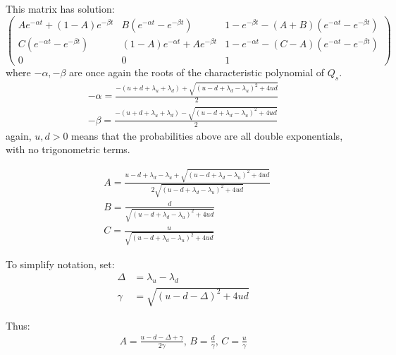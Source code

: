 This matrix has solution:
\begin{equation}
\begin{pmatrix}
Ae^{-\alpha t} + (1-A)e^{-\beta t} & B\left(e^{-\alpha t} - e^{-\beta t}\right) & 1-e^{-\beta t} - (A+B)\left(e^{-\alpha t} - e^{-\beta t}\right) \\
C\left(e^{-\alpha t} - e^{-\beta t}\right) & (1-A)e^{-\alpha t} + Ae^{-\beta t} & 1-e^{-\alpha t} - (C-A)\left(e^{-\alpha t} - e^{-\beta t}\right)\\
0 & 0 & 1
\end{pmatrix}
\end{equation}
where $-\alpha,-\beta$ are once again the roots of the characteristic polynomial of $Q_s$.
\begin{equation}
\begin{split}
-\alpha = \frac{-(u+d+\lambda_u+\lambda_d) + \sqrt{(u-d+\lambda_d-\lambda_u)^2+4ud}}{2}\\
-\beta = \frac{-(u+d+\lambda_u+\lambda_d) - \sqrt{(u-d+\lambda_d-\lambda_u)^2+4ud}}{2}
\end{split}
\end{equation}
again, $u,d>0$ means that the probabilities above are all double exponentials, with no trigonometric terms.

\begin{equation}
\begin{split}
& A = \frac{u-d+\lambda_d-\lambda_u + \sqrt{(u-d+\lambda_d-\lambda_u)^2+4ud}}{2\sqrt{(u-d+\lambda_d-\lambda_u)^2 + 4ud}}\\
& B = \frac{d}{\sqrt{(u-d+\lambda_d-\lambda_u)^2 + 4ud}}\\
& C = \frac{u}{\sqrt{(u-d+\lambda_d-\lambda_u)^2 + 4ud}}
\end{split}
\end{equation}

To simplify notation, set:
\begin{equation}
\begin{split}
\label{dg}
\Delta &= \lambda_u - \lambda_d\\
\gamma &= \sqrt{(u-d-\Delta)^2 + 4ud}
\end{split}
\end{equation}

Thus:
\begin{equation}
\begin{split}
A = \frac{u-d - \Delta + \gamma}{2\gamma},\, B = \frac{d}{\gamma}, \,C = \frac{u}{\gamma}
\end{split}
\end{equation}

